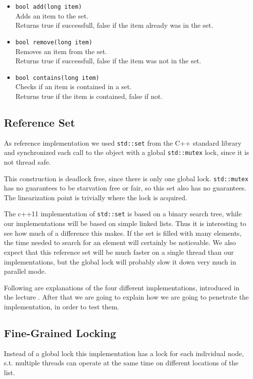 \begin{itemize}
  \item \texttt{bool add(long item)}\\
  	Adds an item to the set.\\
	Returns true if successfull, false if the item already was in the set.
  \item \texttt{bool remove(long item)}\\
  	Removes an item from the set.\\
	Returns true if successfull, false if the item was not in the set.
  \item \texttt{bool contains(long item)}\\
  	Checks if an item is contained in a set.\\
	Returns true if the item is contained, false if not.
\end{itemize}

\subsection{Reference Set}
As reference implementation we used \texttt{std::set} from the C++ standard library and synchronized each call to the object with a global \texttt{std::mutex} lock, since it is not thread safe.

This construction is deadlock free, since there is only one global lock. \texttt{std::mutex} has no guarantees to be starvation free or fair, so this set also has no guarantees. The linearization point is trivially where the lock is acquired.

The c++11 implementation of \texttt{std::set} is based on a binary search tree, while our implementations will be based on simple linked lists. Thus it is interesting to see how much of a difference this makes. If the set is filled with many elements, the time needed to search for an element will certainly be noticeable. We also expect that this reference set will be much faster on a single thread than our implementations, but the global lock will probably slow it down very much in parallel mode.

Following are explanations of the four different implementations, introduced in the lecture \cite{traeffSlides}. After that we are going to explain how we are going to penetrate the implementation, in order to test them.
\subsection{Fine-Grained Locking}
Instead of a global lock this implementation has a lock for each individual node, s.t. multiple threads can operate at the same time on different locations of the list.

